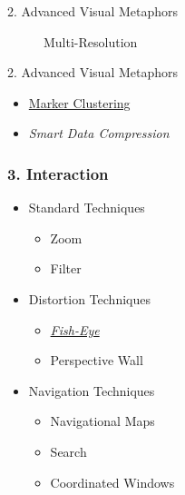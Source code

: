 \begin{frame}{2. Advanced Visual Metaphors}
    \begin{figure}
        \centering
        \caption{Multi-Resolution}
        \label{fig:multi-resolution-explained}
    \end{figure}
\end{frame}

\begin{frame}{2. Advanced Visual Metaphors}
\begin{itemize}
    \item \href{http://bl.ocks.org/gisminister/10001728}{Marker Clustering}
    \item \textit{Smart Data Compression}
\end{itemize}
\end{frame}

\begin{frame}
	\frametitle{3. Interaction}
	\begin{itemize}
		\item Standard Techniques
		\begin{itemize}
		    \item Zoom
		    \item Filter
		\end{itemize}
		\item Distortion Techniques
		\begin{itemize}
		    \item \href{https://bost.ocks.org/mike/fisheye/}{\textit{Fish-Eye}}
		    \item Perspective Wall
		\end{itemize}
		\item Navigation Techniques
		\begin{itemize}
		    \item Navigational Maps
		    \item Search
		    \item Coordinated Windows
		\end{itemize}
	\end{itemize}
\end{frame}